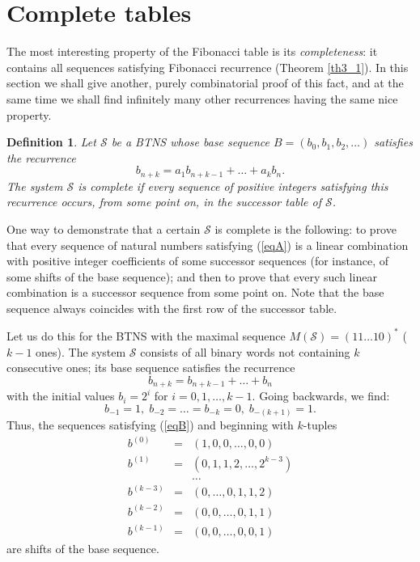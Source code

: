 \documentclass[12pt]{article}
\newtheorem{definition}[theorem]{Definition}
\begin{document}
\section{Complete tables}

The most interesting property of the Fibonacci table is its 
{\em completeness}: it contains all sequences satisfying Fibonacci
recurrence (Theorem \ref{th3_1}). In this section we shall give another,
purely combinatorial proof of this fact, and at the same time we shall
find infinitely many other recurrences having the same nice property.

\begin{definition}
Let $\mathcal{S}$ be a BTNS whose base sequence $B=(b_0,b_1,b_2,\ldots)$
satisfies the recurrence
\begin{equation}\label{eqA}
b_{n+k}=a_1b_{n+k-1}+\ldots+a_kb_n.
\end{equation}
The system $\mathcal{S}$ is complete if every sequence of positive integers
satisfying this recurrence occurs, from some point on, in the successor 
table of $\mathcal{S}$.
\end{definition}

One way to demonstrate that a certain $\mathcal{S}$ is complete is the 
following: to prove that every sequence of natural numbers satisfying
(\ref{eqA}) is a linear combination with positive integer coefficients
of some successor sequences (for instance, of some shifts of the base 
sequence); and then to prove that every such linear combination is
a successor sequence from some point on. Note that the 
base sequence always coincides with the first row of the successor 
table. 

Let us do this for the BTNS with the maximal sequence 
$M(\mathcal{S})=(11\ldots 10)^*$ ($k-1$ ones). The system $\mathcal{S}$
consists of all binary words not containing $k$ consecutive ones;
its base sequence satisfies the recurrence 
\begin{equation}\label{eqB}
b_{n+k}=b_{n+k-1}+\ldots+b_n
\end{equation}
with the initial values $b_i=2^i$ for $i=0,1,\ldots,k-1$. 
Going backwards, we find:
$$b_{-1}=1,\;b_{-2}=\ldots=b_{-k}=0,\;b_{-(k+1)}=1.$$
Thus, the sequences satisfying (\ref{eqB}) and beginning with $k$-tuples
\begin{eqnarray*}
b^{(0)}&=&(1,0,0,\ldots,0,0)\\
b^{(1)}&=&(0,1,1,2,\ldots,2^{k-3})\\
&&\ldots\\
b^{(k-3)}&=&(0,\ldots,0,1,1,2)\\
b^{(k-2)}&=&(0,0,\ldots,0,1,1)\\
b^{(k-1)}&=&(0,0,\ldots,0,0,1)
\end{eqnarray*}
are shifts of the base sequence.
\end{document}
